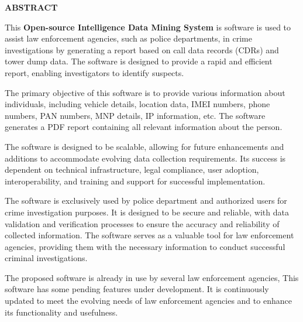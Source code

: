\thispagestyle{plain}
\begin{center}
    \Large \textbf{\uppercase{Abstract}}
\end{center}

\vspace{3\baselineskip}

\vspace{1ex}


\justify

 This \textbf{Open-source Intelligence Data Mining System} is software is used to assist law enforcement agencies, such as police departments, in crime investigations by generating a report based on call data records (CDRs) and tower dump data. The software is designed to provide a rapid and efficient report, enabling investigators to identify suspects.

The primary objective of this software is to provide various information about individuals, including vehicle details, location data, IMEI numbers, phone numbers, PAN numbers, MNP details, IP information, etc. The software generates a PDF report containing all relevant information about the person.

The software is designed to be scalable, allowing for future enhancements and additions to accommodate evolving data collection requirements. Its success is dependent on technical infrastructure, legal compliance, user adoption, interoperability, and training and support for successful implementation.

The software is exclusively used by police department and authorized users for crime investigation purposes. It is designed to be secure and reliable, with data validation and verification processes to ensure the accuracy and reliability of collected information. The software serves as a valuable tool for law enforcement agencies, providing them with the necessary information to conduct successful criminal investigations.

The proposed software is already in use by several law enforcement agencies, This software has some pending features under development. It is continuously updated to meet the evolving needs of law enforcement agencies and to enhance its functionality and usefulness.